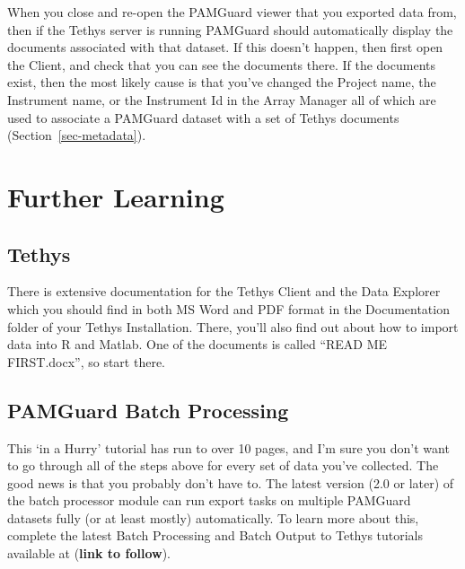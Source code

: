 \documentclass[
]{article}
\begin{document}
When you close and re-open the PAMGuard viewer that you exported data
from, then if the Tethys server is running PAMGuard should automatically
display the documents associated with that dataset. If this doesn't
happen, then first open the Client, and check that you can see the
documents there. If the documents exist, then the most likely cause is
that you've changed the Project name, the Instrument name, or the
Instrument Id in the Array Manager all of which are used to associate a
PAMGuard dataset with a set of Tethys documents
(Section~\ref{sec-metadata}).

\section{Further Learning}\label{further-learning}

\subsection{Tethys}\label{tethys}

There is extensive documentation for the Tethys Client and the Data
Explorer which you should find in both MS Word and PDF format in the
Documentation folder of your Tethys Installation. There, you'll also
find out about how to import data into R and Matlab. One of the
documents is called ``READ ME FIRST.docx'', so start there.

\subsection{PAMGuard Batch Processing}\label{pamguard-batch-processing}

This `in a Hurry' tutorial has run to over 10 pages, and I'm sure you
don't want to go through all of the steps above for every set of data
you've collected. The good news is that you probably don't have to. The
latest version (2.0 or later) of the batch processor module can run
export tasks on multiple PAMGuard datasets fully (or at least mostly)
automatically. To learn more about this, complete the latest Batch
Processing and Batch Output to Tethys tutorials available at
(\textbf{link to follow}).
\end{document}
